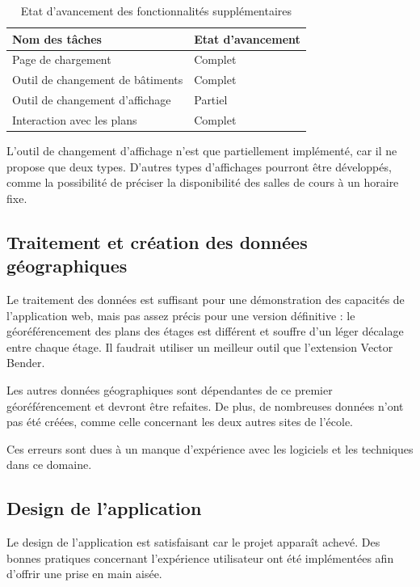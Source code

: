 \documentclass[
    iai, %
    il, %
]{heig-tb}
\begin{document}
\begin{table}[h]
    \begin{center}
        \begin{tabular}{l|l}
            Nom des tâches                   & Etat d'avancement \\ \hline
            Page de chargement               & Complet           \\
            Outil de changement de bâtiments & Complet           \\
            Outil de changement d'affichage  & Partiel           \\
            Interaction avec les plans       & Complet
        \end{tabular}
        \caption{Etat d'avancement des fonctionnalités supplémentaires  \label{autres}}
    \end{center}
\end{table}

L'outil de changement d'affichage n'est que partiellement implémenté, car il ne propose que deux types.
D'autres types d'affichages pourront être développés, comme la possibilité de préciser la disponibilité des salles de cours à un horaire fixe.

\subsection{Traitement et création des données géographiques}
Le traitement des données est suffisant pour une démonstration des capacités de l'application web,
mais pas assez précis pour une version définitive : le géoréférencement des plans des étages est différent
et souffre d'un léger décalage entre chaque étage.
Il faudrait utiliser un meilleur outil que l'extension Vector Bender.

Les autres données géographiques sont dépendantes de ce premier géoréférencement et devront être refaites.
De plus, de nombreuses données n'ont pas été créées, comme celle concernant les deux autres sites de l'école.

Ces erreurs sont dues à un manque d'expérience avec les logiciels et les techniques dans ce domaine.

\subsection{Design de l'application}
Le design de l'application est satisfaisant car le projet apparaît achevé.
Des bonnes pratiques concernant l'expérience utilisateur ont été implémentées afin d'offrir une prise en main aisée.
\end{document}
